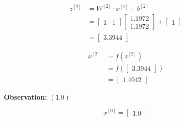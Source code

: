 \documentclass[12pt]{article}
\begin{document}
\begin{enumerate}[leftmargin=\labelsep]
\begin{paracol}{3}
              $$
                  \begin{aligned}
                      z^{[2]} & = W^{[2]} \cdot x^{[1]} + b^{[2]} \\
                              & = \begin{bmatrix}
                                      1 &
                                      1
                                  \end{bmatrix}
                      \begin{bmatrix}
                          1.1972 \\
                          1.1972
                      \end{bmatrix}
                      +
                      \begin{bmatrix}
                          1
                      \end{bmatrix}                              \\
                              & = \begin{bmatrix}{}
                                      3.3944
                                  \end{bmatrix}
                  \end{aligned}
              $$

              $$
                  \begin{aligned}
                      x^{[2]} & = f(z^{[2]})                  \\
                              & = f\left(\begin{bmatrix}{}
                                                 3.3944
                                             \end{bmatrix}\right) \\
                              & = \begin{bmatrix}{}
                                      1.4042
                                  \end{bmatrix}
                  \end{aligned}
              $$

              \switchcolumn

              \begin{center}
                  \textbf{Observation: $(1.0)$}
              \end{center}

              $$
                  x^{[0]} = \begin{bmatrix}
                      1.0
                  \end{bmatrix}
              $$


\end{paracol}
\end{enumerate}
\end{document}
